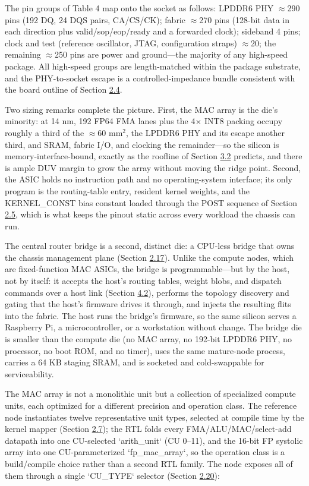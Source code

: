 \documentclass[10pt,twocolumn]{article}
\begin{document}
The pin groups of Table 4 map onto the socket as follows: LPDDR6 PHY $\approx$290 pins (192 DQ, 24 DQS pairs, CA/CS/CK); fabric $\approx$270 pins (128-bit data in each direction plus valid/sop/eop/ready and a forwarded clock); sideband 4 pins; clock and test (reference oscillator, JTAG, configuration straps) $\approx$20; the remaining $\approx$250 pins are power and ground---the majority of any high-speed package. All high-speed groups are length-matched within the package substrate, and the PHY-to-socket escape is a controlled-impedance bundle consistent with the board outline of Section \hyperref[sec:2.4]{2.4}.

Two sizing remarks complete the picture. First, the MAC array is the die's minority: at 14 nm, 192 FP64 FMA lanes plus the 4$\times$ INT8 packing occupy roughly a third of the $\approx$60 mm$^2$, the LPDDR6 PHY and its escape another third, and SRAM, fabric I/O, and clocking the remainder---so the silicon is memory-interface-bound, exactly as the roofline of Section \hyperref[sec:3.2]{3.2} predicts, and there is ample DUV margin to grow the array without moving the ridge point. Second, the ASIC holds no instruction path and no operating-system interface; its only program is the routing-table entry, resident kernel weights, and the KERNEL\_CONST bias constant loaded through the POST sequence of Section \hyperref[sec:2.5]{2.5}, which is what keeps the pinout static across every workload the chassis can run.

The central router bridge is a second, distinct die: a CPU-less bridge that owns the chassis management plane (Section \hyperref[sec:2.17]{2.17}). Unlike the compute nodes, which are fixed-function MAC ASICs, the bridge is programmable---but by the host, not by itself: it accepts the host's routing tables, weight blobs, and dispatch commands over a host link (Section \hyperref[sec:4.2]{4.2}), performs the topology discovery and gating that the host's firmware drives it through, and injects the resulting flits into the fabric. The host runs the bridge's firmware, so the same silicon serves a Raspberry Pi, a microcontroller, or a workstation without change. The bridge die is smaller than the compute die (no MAC array, no 192-bit LPDDR6 PHY, no processor, no boot ROM, and no timer), uses the same mature-node process, carries a 64 KB staging SRAM, and is socketed and cold-swappable for serviceability.

The MAC array is not a monolithic unit but a collection of specialized compute units, each optimized for a different precision and operation class. The reference node instantiates twelve representative unit types, selected at compile time by the kernel mapper (Section \hyperref[sec:2.7]{2.7}); the RTL folds every FMA/ALU/MAC/select-add datapath into one CU-selected `arith\_unit` (CU 0--11), and the 16-bit FP systolic array into one CU-parameterized `fp\_mac\_array`, so the operation class is a build/compile choice rather than a second RTL family. The node exposes all of them through a single `CU\_TYPE` selector (Section \hyperref[sec:2.20]{2.20}):
\end{document}
